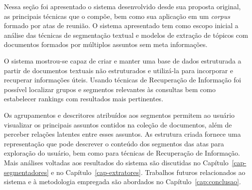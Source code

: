 Nessa seção foi apresentado o sistema desenvolvido desde sua proposta original, as principais técnicas que o compõe, bem como sua aplicação em um \textit{corpus} formado por atas de reunião. O sistema apresentado tem como escopo inicial a análise das técnicas de segmentação textual e modelos de extração de tópicos com documentos formados por múltiplos assuntos sem meta informações. 

O sistema mostrou-se capaz de criar e manter uma base de dados estruturada a partir de documentos textuais não estruturados e utilizá-la para incorporar e  recuperar informações úteis. Usando técnicas de Recuperação de Informação foi possível localizar grupos e segmentos relevantes às consultas bem como estabelecer rankings com resultados mais pertinentes.

Os agrupamentos e descritores  atribuídos aos segmentos permitem ao usuário visualizar os principais assuntos contidos na coleção de documentos, além de perceber relações latentes entre esses assuntos. As estrutura criada fornece uma representação que pode descrever o conteúdo dos segmentos das atas para exploração do usuário, bem como para técnicas de Recuperação de Informação. Mais análises voltadas aos resultados do sistema são discutidas no Capítulo~\ref{cap-segmentadores} e no Capítulo~\ref{cap-extratores}. Trabalhos futuros relacionados ao sistema e à metodologia empregada são abordados no Capítulo~\ref{cap:conclusao}.






























